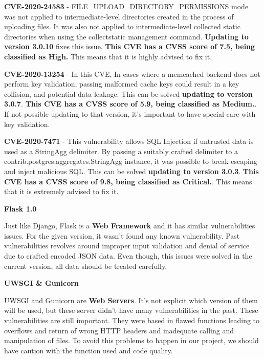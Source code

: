 \textbf{CVE-2020-24583} - FILE\_UPLOAD\_DIRECTORY\_PERMISSIONS mode was not applied to intermediate-level directories created in the process of uploading files. It was also not applied to intermediate-level collected static directories when using the collectstatic management command. \cite{django3} \textbf{Updating to version 3.0.10} fixes this issue. \textbf{This CVE has a CVSS score of 7.5, being classified as High.} This means that it is highly advised to fix it.

\textbf{CVE-2020-13254} - In this CVE, In cases where a memcached backend does not perform key validation, passing malformed cache keys could result in a key collision, and potential data leakage. This can be solved \textbf{updating to version 3.0.7}.\cite{django4} \textbf{This CVE has a CVSS score of 5.9, being classified as Medium.}. If not possible updating to that version, it's important to have special care with key validation.

\textbf{CVE-2020-7471} - This vulnerability allows SQL Injection if untrusted data is used as a StringAgg delimiter. By passing a suitably crafted delimiter to a contrib.postgres.aggregates.StringAgg instance, it was possible to break escaping and inject malicious SQL.\cite{django5} This can be solved \textbf{updating to version 3.0.3}. \textbf{This CVE has a CVSS score of 9.8, being classified as Critical.}. This means that it is extremely advised to fix it.

\vspace{0.4cm}
\textbf{Flask 1.0}

Just like Django, Flask is a \textbf{Web Framework} and it has similar vulnerabilities issues. For the given version, it wasn't found any known vulnerability. Past vulnerabilities revolves around improper input validation and denial of service due to crafted encoded JSON data. Even though, this issues were solved in the current version, all data should be treated carefully.

\vspace{0.4cm}
\textbf{UWSGI \& Gunicorn}

UWSGI and Gunicorn are \textbf{Web Servers}. It's not explicit which version of them will be used, but these server didn't have many vulnerabilities in the past. These vulnerabilities are still important. They were based in flawed functions leading to overflows and return of wrong HTTP headers and inadequate calling and manipulation of files. To avoid this problems to happen in our project, we should have caution with the function used and code quality. 



